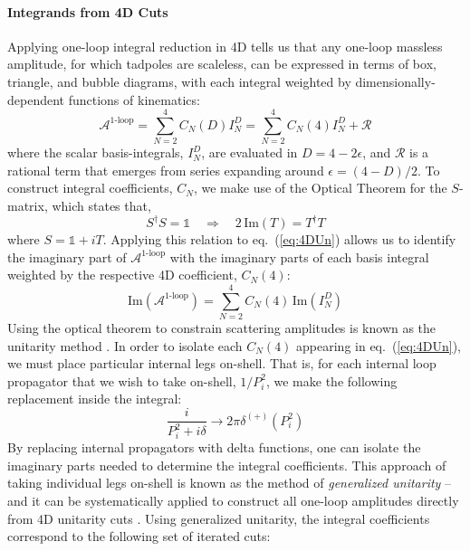 \documentclass[11pt,letter]{article}
\def\eqn#1{eq.~(\ref{#1})}
\begin{document}
\paragraph{Integrands from 4D Cuts}
Applying one-loop integral reduction in 4D tells us that any one-loop massless amplitude, for which tadpoles are scaleless, can be expressed in terms of box, triangle, and bubble diagrams, with each integral weighted by dimensionally-dependent functions of kinematics:
\begin{equation}\label{eq:4DUn}
\mathcal{A}^{\text{1-loop}}= \sum_{N=2}^4 C_N(D)I_N^D = \sum_{N=2}^4 C_N(4)I_N^D+ \mathcal{R}
\end{equation}
where the scalar basis-integrals, $I_N^D$, are evaluated in $D=4-2\epsilon$, and $\mathcal{R}$ is a rational term that emerges from series expanding around $\epsilon=(4-D)/2$. To construct integral coefficients, $C_N$, we make use of the Optical Theorem for the $S$-matrix, which states that,
\begin{equation}
S^\dagger S = \mathbb{1} \quad \Rightarrow \quad 2\,\text{Im}(T) = T^\dagger T
\end{equation}
where $S=\mathbb{1}+iT$. Applying this relation to \eqn{eq:4DUn} allows us to identify the imaginary part of $\mathcal{A}^{\text{1-loop}}$ with the imaginary parts of each basis integral weighted by the respective 4D coefficient, $C_N(4)$:
\begin{equation}\label{eq:UnMeth1loop}
\text{Im}(\mathcal{A}^{\text{1-loop}}) = \sum_{N=2}^4 C_N(4)\, \text{Im}(I_N^D)
\end{equation}
Using the optical theorem to constrain scattering amplitudes is known as the unitarity method \cite{UnitarityMethod, BDKUniarityReview}. In order to isolate each $C_N(4)$ appearing in \eqn{eq:4DUn}, we must place particular internal legs on-shell. That is, for each internal loop propagator that we wish to take on-shell, $1/P_i^2$, we make the following replacement inside the integral:
\begin{equation}
\frac{i}{P_i^2 + i\delta} \rightarrow 2\pi \delta^{(+)}(P_i^2)
\end{equation}
By replacing internal propagators with delta functions, one can isolate the imaginary parts needed to determine the integral coefficients. This approach of taking individual legs on-shell is known as the method of \textit{generalized unitarity} -- and it can be systematically applied to construct all one-loop amplitudes directly from 4D unitarity cuts \cite{Forde:2007mi}. Using generalized unitarity, the integral coefficients correspond to the following set of iterated cuts:
\end{document}

